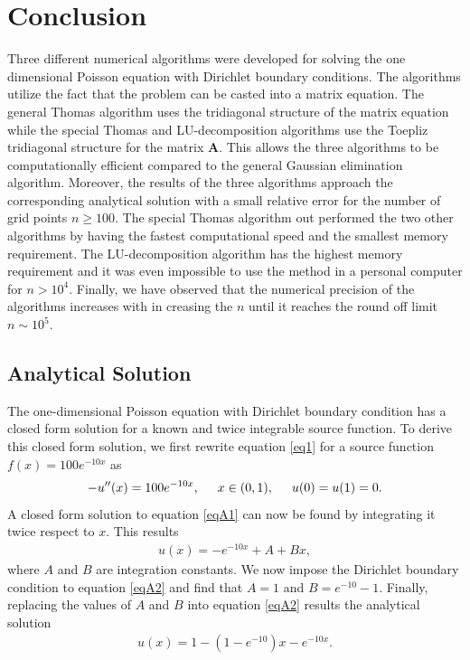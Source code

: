 \documentclass[a4paper]{article}
\begin{document}
\section{Conclusion}
Three different numerical algorithms were developed for solving the one dimensional Poisson equation with Dirichlet boundary conditions. The algorithms utilize the fact that the problem can be casted into a matrix equation. The general Thomas algorithm uses the tridiagonal structure of the matrix equation while the special Thomas and LU-decomposition algorithms use the Toepliz tridiagonal structure for the matrix $\mathbf{A}$. This allows the three algorithms to be computationally efficient compared to the general Gaussian elimination algorithm. Moreover, the results of the three algorithms approach the corresponding analytical solution with a small relative error for the number of grid points $n \geq 100$. The special Thomas algorithm out performed the two other algorithms by having the fastest computational speed and the smallest memory requirement. The LU-decomposition algorithm has the highest memory requirement and it was even impossible to use the method in a personal computer for $n > 10^{4}$. Finally, we have observed that the numerical precision of the algorithms increases with in creasing the $n$ until it reaches the round off limit $n \sim 10^{5}$.\\

%
%



\begin{appendix}
\section{Analytical Solution}
\label{ana-sol}
The one-dimensional Poisson equation with Dirichlet boundary condition has a closed form solution for a known and twice integrable source function. To derive this closed form solution, we first rewrite equation \eqref{eq1} for a source function $f(x) = 100 e^{-10x}$ as
\begin{align}
  -u''(x) = 100 e^{-10x}, \hspace{0.5cm} x\in(0,1), \hspace{0.5cm} u(0) = u(1) = 0.
  \label{eqA1}
\end{align}
A closed form solution to equation \eqref{eqA1} can now be found by integrating it twice respect to $x$. This results 
\begin{align}
  u(x) = -e^{-10x} + A + Bx,
  \label{eqA2}
\end{align}
where $A$ and $B$ are integration constants. We now impose the Dirichlet boundary condition to equation \eqref{eqA2} and find that $A=1$ and $B=e^{-10}-1$. Finally, replacing the values of $A$ and $B$ into equation \eqref{eqA2} results the analytical solution
\begin{align}
  u(x) = 1 - (1 - e^{-10})x - e^{-10x}.
\end{align}
\end{appendix}
\end{document}
